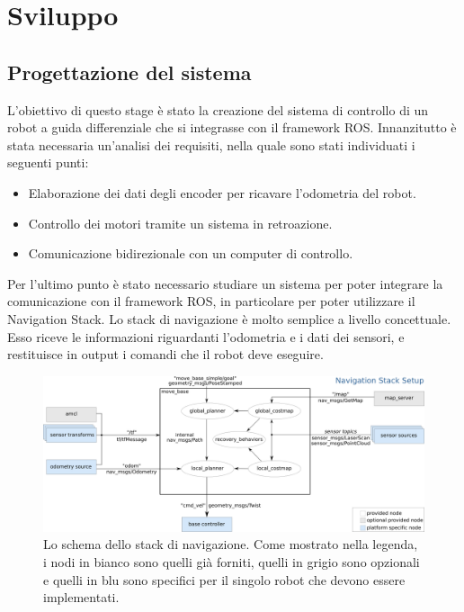 \chapter{Sviluppo}

\section{Progettazione del sistema}
L'obiettivo di questo stage è stato la creazione del sistema di controllo di un robot a guida differenziale che si integrasse con il framework ROS.
Innanzitutto è stata necessaria un'analisi dei requisiti, nella quale sono stati individuati i seguenti punti: 
\begin{itemize}
    \item Elaborazione dei dati degli encoder per ricavare l'odometria del robot.
    \item Controllo dei motori tramite un sistema in retroazione.
    \item Comunicazione bidirezionale con un computer di controllo.
\end{itemize}

Per l'ultimo punto è stato necessario studiare un sistema per poter integrare la comunicazione con il framework ROS, in particolare per poter utilizzare il Navigation Stack.
Lo stack di navigazione è molto semplice a livello concettuale. Esso riceve le informazioni riguardanti l'odometria e i dati dei sensori, e restituisce in output i comandi che il robot deve eseguire.

\begin{figure}[h]
    \centering
    \includegraphics[width=\textwidth]{images/navigation_stack.png}
    \caption{Lo schema dello stack di navigazione. Come mostrato nella legenda, i nodi in
bianco sono quelli già forniti, quelli in grigio sono opzionali e quelli in blu sono specifici per il singolo robot che devono essere implementati.}
  \label{fig:navigation_stack}
\end{figure}

